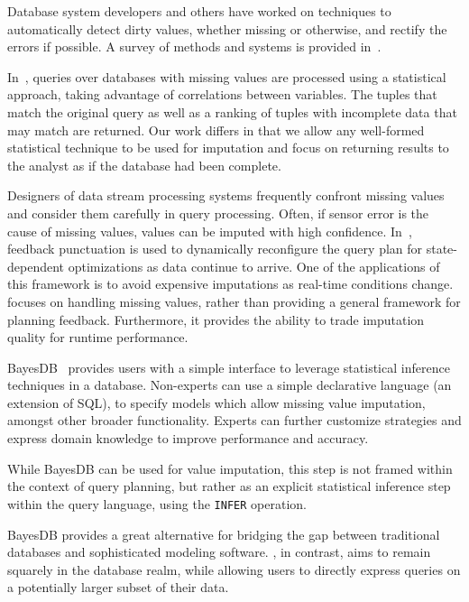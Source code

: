 Database system developers and others have worked on techniques to automatically
detect dirty values, whether missing or otherwise, and rectify the errors if
possible. A survey of methods and systems is provided in~\cite{hellerstein2008quantitative}.

In~\cite{wolf2007query}, queries over databases with missing values are
processed using a statistical approach, taking advantage of correlations between
variables. The tuples that match the original query as well as a ranking of
tuples with incomplete data that may match are returned. Our work differs in
that we allow any well-formed statistical technique to be used for imputation
and focus on returning results to the analyst as if the database had been
complete.

Designers of data stream processing systems frequently confront missing values
and consider them carefully in query processing. Often, if sensor error is the
cause of missing values, values can be imputed with high confidence. In~\cite{fernandez2009inter}, feedback punctuation is used to dynamically
reconfigure the query plan for state-dependent
optimizations as data continue to arrive. One of the applications of this framework is to avoid
expensive imputations as real-time conditions change. 
\ProjectName{} focuses on handling
missing values, rather than providing a general framework for planning feedback. Furthermore,
it provides the ability
to trade imputation quality for runtime performance. 

BayesDB~\cite{mansinghka2015bayesdb} provides users with a simple interface to 
leverage statistical inference techniques in a database. Non-experts
can use a simple declarative language (an extension of SQL), to specify models
which allow missing value imputation, amongst other broader functionality.
Experts can further customize strategies and express domain knowledge to
improve performance and accuracy.

While BayesDB can be used for value imputation, this step is not framed
within the context of query planning, but rather as an explicit statistical
inference step within the query language, using the \verb|INFER| operation. 

BayesDB provides a great alternative for bridging the gap between
traditional databases and sophisticated modeling software. \ProjectName{}, in
contrast, aims to remain squarely in the database realm, while allowing
users to directly express queries on a potentially larger subset of their data.


